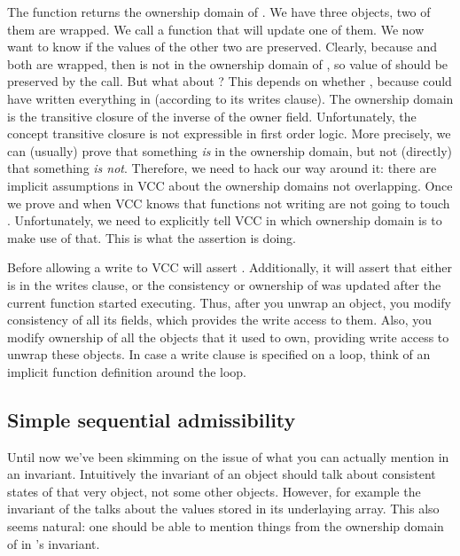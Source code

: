 \noindent
The function  returns the ownership
domain of .
We have three objects, two of them are wrapped.
We call a function that will update one of them.
We now want to know if the values of the other two are preserved.
Clearly, because  and both are wrapped, then
 is not in the ownership domain of ,
so value of  should be preserved by the call.
But what about ?
This depends on whether ,
because  could have written everything
in  (according to its writes clause).
The ownership domain is the transitive closure of the inverse of the
owner field.
Unfortunately, the concept transitive
closure is not expressible in first order logic.
More precisely, we can (usually) prove that something \emph{is} in the ownership
domain, but not (directly) that something \emph{is not}.
Therefore, we need to hack our way around it: there are implicit
assumptions in VCC about the ownership domains not overlapping.
Once we prove  and 
when VCC knows that functions not writing  are not
going to touch .
Unfortunately, we need to explicitly tell VCC in
which ownership domain  is to make use of that.
This is what the assertion  is doing.

\begin{note}
Before allowing a write to  VCC will assert .
Additionally, it will assert that either  is in the writes
clause, or the consistency or ownership of  was updated after the current
function started executing.
Thus, after you unwrap an object, you modify consistency of all its fields,
which provides the write access to them.
Also, you modify ownership of all the objects that it used to own, providing
write access to unwrap these objects.
In case a write clause is specified on a loop, think of an implicit function
definition around the loop.
\end{note}

\subsection{Simple sequential admissibility}
\label{sect:admissibility0}

Until now we've been skimming on the issue of what you can actually
mention in an invariant. 
Intuitively the invariant of an object should talk about consistent states
of that very object, not some other objects.
However, for example the invariant of the  
talks about the values stored in its underlaying array.
This also seems natural: one should be able to mention things
from the ownership domain of  in 's invariant.


